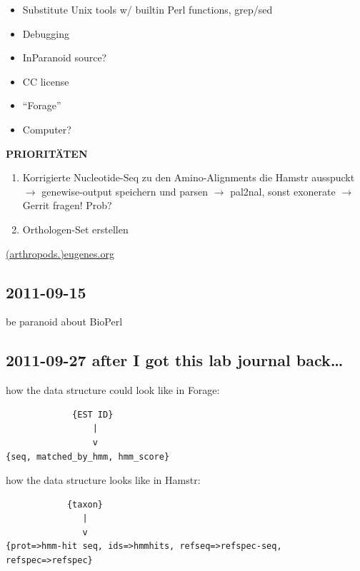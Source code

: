\vspace{1em}
\begin{minipage}{0.4\textwidth}
	\begin{itemize}
		\item Substitute Unix tools w/ builtin Perl functions, \eg grep/sed
		\item Debugging
		\item InParanoid source?
		\item CC license
		\item ``Forage''
		\item Computer?
	\end{itemize}
\end{minipage}
\hfill
\begin{minipage}{0.5\textwidth}
\textbf{PRIORITÄTEN}
\renewcommand{\labelenumi}{\arabic{enumi}.}
	\begin{enumerate}
		\item Korrigierte Nucleotide-Seq zu den Amino-Alignments die Hamstr
		ausspuckt $\rightarrow$ genewise-output speichern und parsen $\rightarrow$ pal2nal,
		sonst exonerate $\rightarrow$ Gerrit fragen! Prob?
		\item Orthologen-Set erstellen
	\end{enumerate}
\url{(arthropods.)eugenes.org}
\end{minipage}

\subsection*{2011-09-15}

be paranoid about BioPerl

\subsection*{2011-09-27 after I got this lab journal back\dots}

how the data structure could look like in Forage:

\begin{verbatim}
             {EST ID}
                 |
                 v
{seq, matched_by_hmm, hmm_score}
\end{verbatim}

how the data structure looks like in Hamstr:
\begin{verbatim}
            {taxon}
               |
               v
{prot=>hmm-hit seq, ids=>hmmhits, refseq=>refspec-seq, refspec=>refspec}
\end{verbatim}

